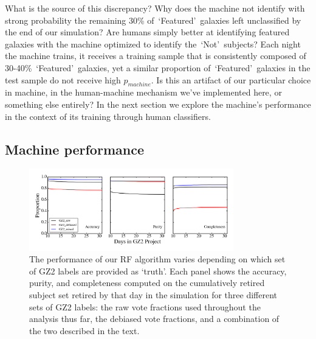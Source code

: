 \documentclass[twocolumn]{aastex6}
\newcommand{\feat}{`Featured'}
\newcommand{\notfeat}{`Not'}
\begin{document}
What is the source of this discrepancy? 
Why does the machine not identify with strong probability the remaining 30\% 
of~\feat~galaxies left unclassified by the end of our simulation? 
Are humans simply better at identifying featured galaxies with the machine optimized
to identify the~\notfeat~subjects? 
Each night the machine trains, it receives a training sample that is consistently composed of 30-40\%~\feat~galaxies, yet a similar proportion of~\feat~galaxies in the test sample
do not receive high $p_{machine}$.
Is this an artifact of our particular choice in machine, in the human-machine mechanism we've implemented here, or something else entirely?
In the next section we explore the machine's performance in the context of its 
training through human classifiers. 

\subsection{Machine performance}\label{sec: machine performance}


\begin{figure}[t!]
\includegraphics[width=3.5in]{figures/GZ2_sup_PLPD5_p5_flipfeature2b_RF_accuracy_redo_raw_combo_machine_metrics_comparison.png}
\caption{The performance of our RF algorithm varies depending on which set of GZ2 labels are provided as `truth'. Each panel shows the accuracy, purity, and completeness computed on the cumulatively retired subject set retired by that day in the simulation for three different sets of GZ2 labels: the raw vote fractions used throughout the analysis thus far, the debiased vote fractions, and a combination of the two described in the text. \label{fig: machine metrics}}
\end{figure}
\end{document}
